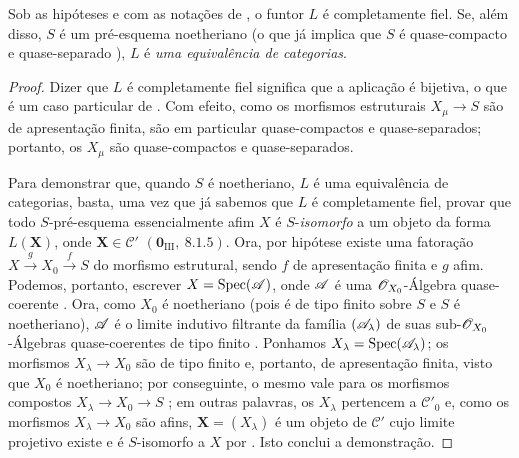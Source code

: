 \begin{proposition}[8.13.5]
\label{IV.8.13.5}
Sob as hipóteses e com as notações de , o funtor $L$ é completamente fiel.
Se, além disso, $S$ é um pré-esquema noetheriano (o que já implica que $S$ é quase-compacto e quase-separado ), $L$ é \emph{uma equivalência de categorias}.
\end{proposition}

\begin{proof}
Dizer que $L$ é completamente fiel significa que a aplicação  é bijetiva, o que é um caso particular de .
Com efeito, como os morfismos estruturais $X_\mu\to S$ são de apresentação finita, são em particular quase-compactos e quase-separados; portanto, os $X_\mu$ são quase-compactos e quase-separados.

Para demonstrar que, quando $S$ é noetheriano, $L$ é uma equivalência de categorias, basta, uma vez que já sabemos que $L$ é completamente fiel, provar que todo $S$-pré-esquema essencialmente afim $X$ é $S$-\emph{isomorfo} a um objeto da forma $L(\mathbf{X})$, onde $\mathbf{X}\in\mathcal{C}'$ $(\mathbf{0}_{\text{III}},~8.1.5)$.
Ora, por hipótese existe uma fatoração $X\xrightarrow{g}X_0\xrightarrow{f}S$ do morfismo estrutural, sendo $f$ de apresentação finita e $g$ afim.
Podemos, portanto, escrever $X=\operatorname{Spec}(\mathscr{A})$, onde $\mathscr{A}$ é uma $\mathscr{O}_{X_0}$-Álgebra quase-coerente .
Ora, como $X_0$ é noetheriano (pois é de tipo finito sobre $S$ e $S$ é noetheriano), $\mathscr{A}$ é o limite indutivo filtrante da família $(\mathscr{A}_\lambda)$ de suas sub-$\mathscr{O}_{X_0}$-Álgebras quase-coerentes de tipo finito .
Ponhamos $X_\lambda=\operatorname{Spec}(\mathscr{A}_\lambda)$; os morfismos $X_\lambda\to X_0$ são de tipo finito e, portanto, de apresentação finita, visto que $X_0$ é noetheriano; por conseguinte, o mesmo vale para os morfismos compostos $X_\lambda\to X_0\to S$ ; em outras palavras, os $X_\lambda$ pertencem a $\mathcal{C}'_0$ e, como os morfismos $X_\lambda\to X_0$ são afins, $\mathbf{X}=(X_\lambda)$ é um objeto de $\mathcal{C}'$ cujo limite projetivo existe e é $S$-isomorfo a $X$ por .
Isto conclui a demonstração.
\end{proof}

